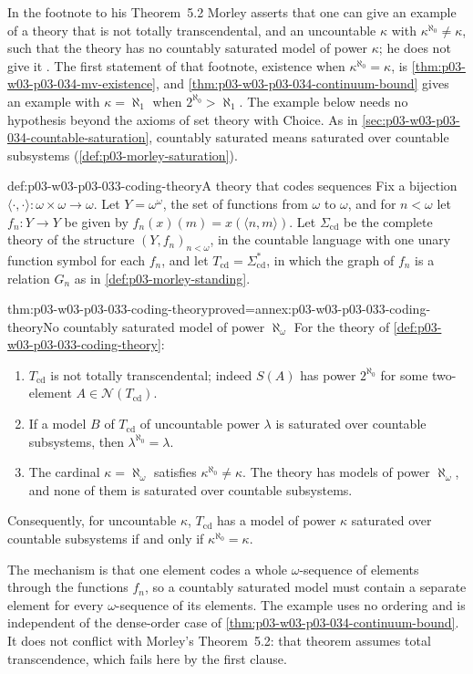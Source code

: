 In the footnote to his Theorem~5.2 Morley asserts that one can give an
example of a theory that is not totally transcendental, and an uncountable
\(\kappa\) with \(\kappa^{\aleph_0}\neq\kappa\), such that the theory has
no countably saturated model of power \(\kappa\); he does not give it
\cite[p.~535, n.~24]{Morley1965}. The first statement of that footnote,
existence when \(\kappa^{\aleph_0}=\kappa\), is
\cref{thm:p03-w03-p03-034-mv-existence}, and
\cref{thm:p03-w03-p03-034-continuum-bound} gives an example with
\(\kappa=\aleph_1\) when \(2^{\aleph_0}>\aleph_1\). The example below
needs no hypothesis beyond the axioms of set theory with Choice. As in
\cref{sec:p03-w03-p03-034-countable-saturation}, countably saturated
means saturated over countable subsystems (\cref{def:p03-morley-saturation}).

\begin{hbexample}{def:p03-w03-p03-033-coding-theory}{A theory that codes sequences}
Fix a bijection \(\langle\cdot,\cdot\rangle:\omega\times\omega\to\omega\).
Let \(Y=\omega^\omega\), the set of functions from \(\omega\) to
\(\omega\), and for \(n<\omega\) let \(f_n:Y\to Y\) be given by
\(f_n(x)(m)=x(\langle n,m\rangle)\). Let \(\Sigma_{\mathrm{cd}}\) be the
complete theory of the structure \((Y,f_n)_{n<\omega}\), in the countable
language with one unary function symbol for each \(f_n\), and let
\(T_{\mathrm{cd}}=\Sigma_{\mathrm{cd}}^*\), in which the graph of \(f_n\)
is a relation \(G_n\) as in \cref{def:p03-morley-standing}.
\end{hbexample}

\begin{hbtheorem}{thm:p03-w03-p03-033-coding-theory}{proved=annex:p03-w03-p03-033-coding-theory}{No countably saturated model of power \(\aleph_\omega\)}
For the theory of \cref{def:p03-w03-p03-033-coding-theory}:
\begin{enumerate}
\item \(T_{\mathrm{cd}}\) is not totally transcendental; indeed \(S(A)\)
has power \(2^{\aleph_0}\) for some two-element
\(A\in\mathcal N(T_{\mathrm{cd}})\).
\item If a model \(B\) of \(T_{\mathrm{cd}}\) of uncountable power
\(\lambda\) is saturated over countable subsystems, then
\(\lambda^{\aleph_0}=\lambda\).
\item The cardinal \(\kappa=\aleph_\omega\) satisfies
\(\kappa^{\aleph_0}\neq\kappa\). The theory has models of power
\(\aleph_\omega\), and none of them is saturated over countable
subsystems.
\end{enumerate}
Consequently, for uncountable \(\kappa\), \(T_{\mathrm{cd}}\) has a model
of power \(\kappa\) saturated over countable subsystems if and only if
\(\kappa^{\aleph_0}=\kappa\).
\end{hbtheorem}

The mechanism is that one element codes a whole \(\omega\)-sequence of
elements through the functions \(f_n\), so a countably saturated model
must contain a separate element for every \(\omega\)-sequence of its
elements. The example uses no ordering and is independent of the
dense-order case of \cref{thm:p03-w03-p03-034-continuum-bound}. It does
not conflict with Morley's Theorem~5.2: that theorem assumes total
transcendence, which fails here by the first clause.
